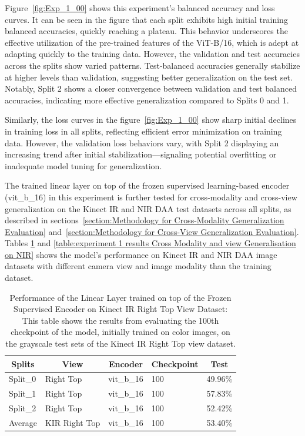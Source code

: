 Figure~\ref{fig:Exp_1_00} shows this experiment's balanced accuracy and loss curves. It can be seen in the figure that each split exhibits high initial training balanced accuracies, quickly reaching a plateau. This behavior underscores the effective utilization of the pre-trained features of the ViT-B/16, which is adept at adapting quickly to the training data. However, the validation and test accuracies across the splits show varied patterns. Test-balanced accuracies generally stabilize at higher levels than validation, suggesting better generalization on the test set. Notably, Split 2 shows a closer convergence between validation and test balanced accuracies, indicating more effective generalization compared to Splits 0 and 1.

Similarly, the loss curves in the figure~\ref{fig:Exp_1_00} show sharp initial declines in training loss in all splits, reflecting efficient error minimization on training data. However, the validation loss behaviors vary, with Split 2 displaying an increasing trend after initial stabilization—signaling potential overfitting or inadequate model tuning for generalization.

The trained linear layer on top of the frozen supervised learning-based encoder (vit\_b\_16) in this experiment is further tested for cross-modality and cross-view generalization on the Kinect IR and NIR DAA test datasets across all splits, as described in sections~\ref{section:Methodology for Cross-Modality Generalization Evaluation} and~\ref{section:Methodology for Cross-View Generalization Evaluation}. Tables \ref{table:experiment 1 results Cross Modality Generalisation} and \ref{table:experiment 1 results Cross Modality and view Generalisation on NIR} shows the model's performance on Kinect IR and NIR DAA image datasets with different camera view and image modality than the training dataset.

\begin{table}[htbp]
\caption[Results of Experiment 1 for Cross Modality Generalisation]{Performance of the Linear Layer trained on top of the Frozen Supervised Encoder on Kinect IR Right Top View Dataset: This table shows the results from evaluating the 100th checkpoint of the model, initially trained on color images, on the grayscale test sets of the Kinect IR Right Top view dataset.}
\label{table:experiment 1 results Cross Modality Generalisation}
\centering
\begin{tabular}{lllll}
\multicolumn{1}{c}{\textbf{Splits}} & \multicolumn{1}{c}{\textbf{View}} & \multicolumn{1}{c}{\textbf{Encoder}} & \multicolumn{1}{c}{\textbf{Checkpoint}} & \multicolumn{1}{c}{\textbf{Test}}\\
\hline
Split\_0 & Right Top & vit\_b\_16 & 100 & 49.96\% \\
Split\_1 & Right Top & vit\_b\_16 & 100 & 57.83\% \\
Split\_2 & Right Top & vit\_b\_16 & 100 & 52.42\% \\
\hline
Average & KIR Right Top & vit\_b\_16 & 100 & 53.40\% \\
\hline
\end{tabular}
\end{table}


